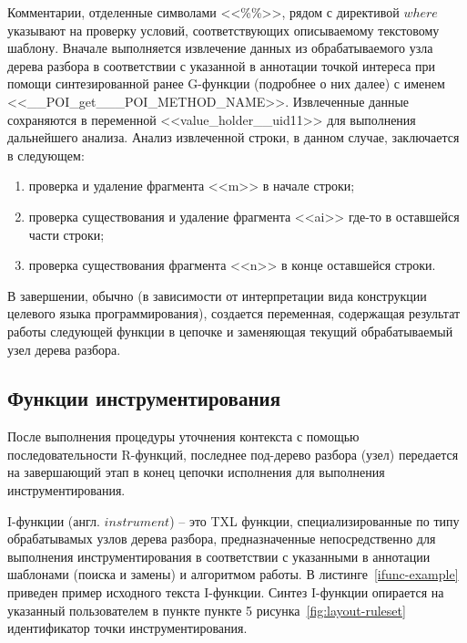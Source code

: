 Комментарии, отделенные символами <<\%\%>>, рядом с директивой $where$ указывают на проверку условий, соответствующих описываемому текстовому шаблону.
Вначале выполняется извлечение данных из обрабатываемого узла дерева разбора в соответствии с указанной в аннотации точкой интереса при помощи синтезированной ранее G-функции (подробнее о них далее) с именем <<\_\_POI\_get\_\_\_POI\_METHOD\_NAME>>.
Извлеченные данные сохраняются в переменной <<value\_holder\_\_uid11>> для выполнения дальнейшего анализа.
Анализ извлеченной строки, в данном случае, заключается в следующем:

\begin{enumerate}[noitemsep]
  \item проверка и удаление фрагмента <<m>> в начале строки;
  \item проверка существования и удаление фрагмента <<ai>> где-то в оставшейся части строки;
  \item проверка существования фрагмента <<n>> в конце оставшейся строки.
\end{enumerate}

В завершении, обычно (в зависимости от интерпретации вида конструкции целевого языка программирования), создается переменная, содержащая результат работы следующей функции в цепочке и заменяющая текущий обрабатываемый узел дерева разбора.

\subsection{Функции инструментирования}

После выполнения процедуры уточнения контекста с помощью последовательности R-функций, последнее под-дерево разбора (узел) передается на завершающий этап в конец цепочки исполнения для выполнения инструментирования.

I-функции (англ. $instrument$) -- это TXL функции, специализированные по типу обрабатывамых узлов дерева разбора, предназначенные непосредственно для выполнения инструментирования в соответствии с указанными в аннотации шаблонами (поиска и замены) и алгоритмом работы.
В листинге~\ref{ifunc-example} приведен пример исходного текста I-функции.
Синтез I-функции опирается на указанный пользователем в пункте пункте 5 рисунка~\ref{fig:layout-ruleset} идентификатор точки инструментирования.

